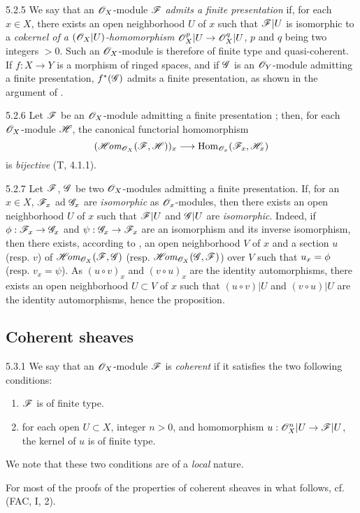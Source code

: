 \begin{env}{5.2.5}
\label{env-0.5.2.5}
We say that an $\mathscr{O}_X$-module $\mathscr{F}$ \emph{admits a finite presentation} if, for each
$x\in X$, there exists an open neighborhood $U$ of $x$ such that $\mathscr{F}|U$ is isomorphic
to a \emph{cokernel of a $(\mathscr{O}_X|U)$-homomorphism $\mathscr{O}_X^p|U\to\mathscr{O}_X^q|U$}, $p$ and $q$ being
two integers $>0$. Such an $\mathscr{O}_X$-module is therefore of finite type and quasi-coherent. If
$f:X\to Y$ is a morphism of ringed spaces, and if $\mathscr{G}$ is an $\mathscr{O}_Y$-module admitting a
finite presentation, $f^*(\mathscr{G})$ admits a finite presentation, as shown in the argument of
.
\end{env}

\begin{env}{5.2.6}
\label{env-0.5.2.6}
Let $\mathscr{F}$ be an $\mathscr{O}_X$-module admitting a finite presentation ; then,
for each $\mathscr{O}_X$-module $\mathscr{H}$, the canonical functorial homomorphism
\[
  (\mathscr{H}\!\textit{om}_{\mathscr{O}_X}(\mathscr{F},\mathscr{H}))_x\longrightarrow{\mathop{\mathrm{Hom}}\nolimits}_{\mathscr{O}_x}(\mathscr{F}_x,\mathscr{H}_x)
\]
is \emph{bijective} (T, 4.1.1).
\end{env}

\begin{env}{5.2.7}
\label{env-0.5.2.7}
Let $\mathscr{F}$, $\mathscr{G}$ be two $\mathscr{O}_X$-modules admitting a finite presentation. If, for an
$x\in X$, $\mathscr{F}_x$ ad $\mathscr{G}_x$ are \emph{isomorphic} as $\mathscr{O}_x$-modules, then there
exists an open neighborhood $U$ of $x$ such that $\mathscr{F}|U$ and $\mathscr{G}|U$ are
\emph{isomorphic}. Indeed, if $\phi:\mathscr{F}_x\to\mathscr{G}_x$ and $\psi:\mathscr{G}_x\to\mathscr{F}_x$ are
an isomorphism and its inverse isomorphism, then there exists, according to
, an open neighborhood $V$ of $x$ and a section $u$ (resp. $v$) of
$\mathscr{H}\!\textit{om}_{\mathscr{O}_X}(\mathscr{F},\mathscr{G})$ (resp. $\mathscr{H}\!\textit{om}_{\mathscr{O}_X}(\mathscr{G},\mathscr{F})$) over $V$ such
that $u_x=\phi$ (resp. $v_x=\psi$). As $(u\circ v)_x$ and $(v\circ u)_x$ are the identity
automorphisms, there exists an open neighborhood $U\subset V$ of $x$ such that $(u\circ v)|U$
and $(v\circ u)|U$ are the identity automorphisms, hence the proposition.
\end{env}

\subsection{Coherent sheaves}
\label{0-prelim-5.3}

\begin{env}{5.3.1}
\label{env-0.5.3.1}
We say that an $\mathscr{O}_X$-module $\mathscr{F}$ is \emph{coherent} if it satisfies the two following
conditions:
\begin{enumerate}[label=(\alph*)]
  \item $\mathscr{F}$ is of finite type.
  \item for each open $U\subset X$, integer $n>0$, and homomorphism $u:\mathscr{O}_X^n|U\to\mathscr{F}|U$,
        the kernel of $u$ is of finite type.
\end{enumerate}
We note that these two conditions are of a \emph{local} nature.

For most of the proofs of the properties of coherent sheaves in what follows,
cf. (FAC, I, 2).
\end{env}

